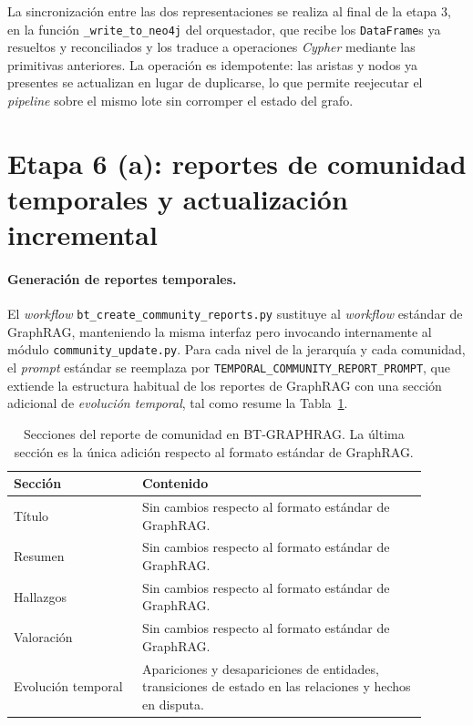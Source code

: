 La sincronización entre las dos representaciones se realiza al final de la etapa 3, en la función \texttt{\_write\_to\_neo4j} del orquestador, que recibe los \texttt{DataFrame}s ya resueltos y reconciliados y los traduce a operaciones \emph{Cypher} mediante las primitivas anteriores. La operación es idempotente: las aristas y nodos ya presentes se actualizan en lugar de duplicarse, lo que permite reejecutar el \emph{pipeline} sobre el mismo lote sin corromper el estado del grafo.

\section{Etapa 6 (a): reportes de comunidad temporales y actualización incremental}\label{sec:impl-community}

\paragraph{Generación de reportes temporales.}
El \emph{workflow} \texttt{bt\_create\_community\_reports.py} sustituye al \emph{workflow} estándar de GraphRAG, manteniendo la misma interfaz pero invocando internamente al módulo \texttt{community\_update.py}. Para cada nivel de la jerarquía y cada comunidad, el \emph{prompt} estándar se reemplaza por \texttt{TEMPORAL\_COMMUNITY\_REPORT\_PROMPT}, que extiende la estructura habitual de los reportes de GraphRAG con una sección adicional de \emph{evolución temporal}, tal como resume la Tabla~\ref{tab:impl-community-sections}.

\begin{table}[H]
\centering
\small
\begin{tabular}{p{0.28\linewidth}p{0.62\linewidth}}
\hline
\textbf{Sección} & \textbf{Contenido} \\ \hline
Título & Sin cambios respecto al formato estándar de GraphRAG. \\
Resumen & Sin cambios respecto al formato estándar de GraphRAG. \\
Hallazgos & Sin cambios respecto al formato estándar de GraphRAG. \\
Valoración & Sin cambios respecto al formato estándar de GraphRAG. \\
Evolución temporal & Apariciones y desapariciones de entidades, transiciones de estado en las relaciones y hechos en disputa. \\ \hline
\end{tabular}
\caption{Secciones del reporte de comunidad en BT-GRAPHRAG. La última sección es la única adición respecto al formato estándar de GraphRAG.}
\label{tab:impl-community-sections}
\end{table}


